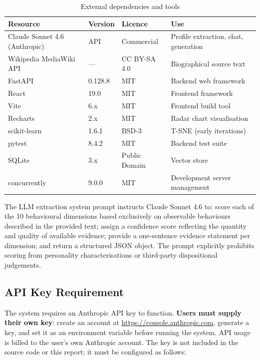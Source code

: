 \documentclass[11pt, a4paper]{report}
\begin{document}
\begin{table}[H]
  \centering
  \caption{External dependencies and tools}
  \label{tab:external}
  \begin{tabular}{llll}
    \toprule
    Resource & Version & Licence & Use \\
    \midrule
    Claude Sonnet 4.6 (Anthropic) & API & Commercial & Profile extraction, chat, generation \\
    Wikipedia MediaWiki API & --- & CC BY-SA 4.0 & Biographical source text \\
    FastAPI & 0.128.8 & MIT & Backend web framework \\
    React & 19.0 & MIT & Frontend framework \\
    Vite & 6.x & MIT & Frontend build tool \\
    Recharts & 2.x & MIT & Radar chart visualisation \\
    scikit-learn & 1.6.1 & BSD-3 & T-SNE (early iterations) \\
    pytest & 8.4.2 & MIT & Backend test suite \\
    SQLite & 3.x & Public Domain & Vector store \\
    concurrently & 9.0.0 & MIT & Development server management \\
    \bottomrule
  \end{tabular}
\end{table}

The LLM extraction system prompt instructs Claude Sonnet 4.6 to: score each of the 10 behavioural dimensions based exclusively on observable behaviours described in the provided text; assign a confidence score reflecting the quantity and quality of available evidence; provide a one-sentence evidence statement per dimension; and return a structured JSON object. The prompt explicitly prohibits scoring from personality characterisations or third-party dispositional judgements.

\subsection*{API Key Requirement}

The system requires an Anthropic API key to function. \textbf{Users must supply their own key}: create an account at \url{https://console.anthropic.com}, generate a key, and set it as an environment variable before running the system. API usage is billed to the user's own Anthropic account. The key is not included in the source code or this report; it must be configured as follows:
\end{document}
